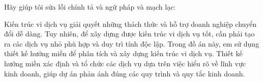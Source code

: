 Hãy giúp tôi sửa lỗi chính tả và ngữ pháp và mạch lạc:

Kiến trúc vi dịch vụ giải quyết những thách thức và hỗ trợ doanh nghiệp chuyển đổi dễ dàng. Tuy nhiên, để xây dựng được kiến trúc vi dịch vụ tốt, cần phải tạo ra các dịch vụ nhỏ phù hợp và duy trì tính độc lập. Trong đồ án này, em sử dụng thiết kế hướng miền để phân tích và xây dựng kiến trúc vi dịch vụ. Thiết kế hướng miền xác định và tổ chức các dịch vụ dựa trên việc hiểu rõ về lĩnh vực kinh doanh, giúp dự án phản ánh đúng các quy trình và quy tắc kinh doanh.